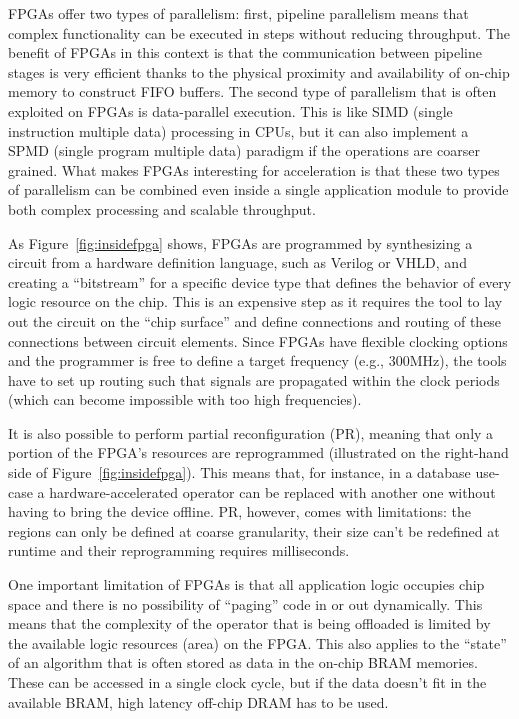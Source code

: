 \documentclass[11pt]{article}
\begin{document}
FPGAs offer two types of parallelism: first, pipeline parallelism means that complex functionality can be executed in steps without reducing throughput. The benefit of FPGAs in this context is that the communication between pipeline stages is very efficient thanks to the physical proximity and availability of on-chip memory to construct FIFO buffers. The second type of parallelism that is often exploited on FPGAs is data-parallel execution. This is like SIMD (single instruction multiple data) processing in CPUs, but it can also implement a SPMD (single program multiple data) paradigm if the operations are coarser grained. What makes FPGAs interesting for acceleration is that these two types of parallelism can be combined even inside a single application module to provide both complex processing and scalable throughput.

As Figure~\ref{fig:insidefpga} shows, FPGAs are programmed by synthesizing a circuit from a hardware definition language, such as Verilog or VHLD, and creating a ``bitstream'' for a specific device type that defines the behavior of every logic resource on the chip. This is an expensive step as it requires the tool to lay out the circuit on the ``chip surface'' and define connections and routing of these connections between circuit elements. Since FPGAs have flexible clocking options and the programmer is free to define a target frequency (e.g., 300MHz), the tools have to set up routing such that signals are propagated within the clock periods (which can become impossible with too high frequencies). 

It is also possible to perform partial reconfiguration (PR), meaning that only a portion of the FPGA's resources are reprogrammed (illustrated on the right-hand side of Figure~\ref{fig:insidefpga}). This means that, for instance, in a database use-case a hardware-accelerated operator can be replaced with another one without having to bring the device offline. PR, however, comes with limitations: the regions can only be defined at coarse granularity, their size can't be redefined at runtime and their reprogramming requires milliseconds. 

One important limitation of FPGAs is that all application logic occupies chip space and there is no possibility of ``paging'' code in or out dynamically. This means that the complexity of the operator that is being offloaded is limited by the available logic resources (area) on the FPGA. This also applies to the ``state'' of an algorithm that is often stored as data in the on-chip BRAM memories. These can be accessed in a single clock cycle, but if the data doesn't fit in the available BRAM, high latency off-chip DRAM has to be used. 
\end{document}
